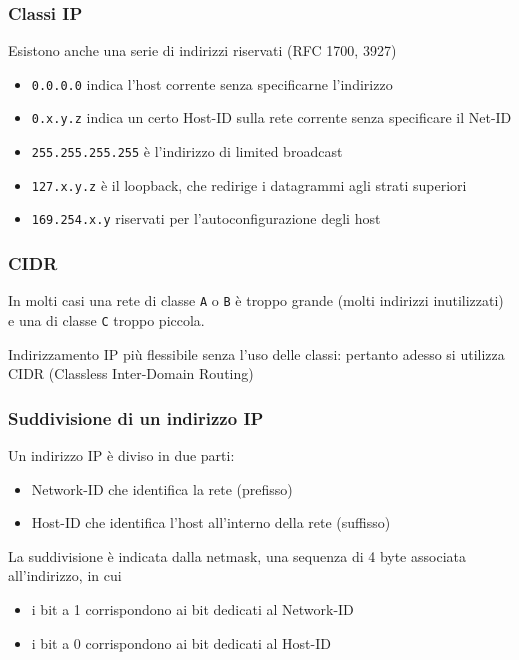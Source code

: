 \documentclass[aspectratio=169]{beamer}
\begin{document}
    \begin{frame}
        \frametitle{Classi IP}
        Esistono anche una serie di indirizzi riservati (RFC 1700, 3927)
        \begin{itemize}
            \item \texttt{0.0.0.0} indica l'host corrente senza specificarne l'indirizzo
            \item \texttt{0.x.y.z} indica un certo Host-ID sulla rete corrente senza specificare il Net-ID
            \item \texttt{255.255.255.255} è l'indirizzo di limited broadcast
            \item \texttt{127.x.y.z} è il loopback, che redirige i datagrammi agli strati superiori
            \item \texttt{169.254.x.y} riservati per l'autoconfigurazione degli host
        \end{itemize}
    \end{frame}
        
    \begin{frame}
        \frametitle{CIDR}
        In molti casi una rete di classe \texttt{A} o \texttt{B} è troppo grande (molti indirizzi inutilizzati) e una di classe \texttt{C} troppo piccola.\vskip 0.3cm
    
        Indirizzamento IP più flessibile senza l'uso delle classi: pertanto adesso si utilizza CIDR (Classless Inter-Domain Routing)
    \end{frame}
    
    \begin{frame}
        \frametitle{Suddivisione di un indirizzo IP}
        Un indirizzo IP è diviso in due parti:
        \begin{itemize}
            \item Network-ID che identifica la rete (prefisso)
            \item Host-ID che identifica l'host all'interno della rete (suffisso)
        \end{itemize}
        La suddivisione è indicata dalla netmask, una sequenza di 4 byte associata all'indirizzo, in cui
        \begin{itemize}
            \item i bit a 1 corrispondono ai bit dedicati al Network-ID
            \item i bit a 0 corrispondono ai bit dedicati al Host-ID
        \end{itemize}
    \end{frame}
    
\end{document}
